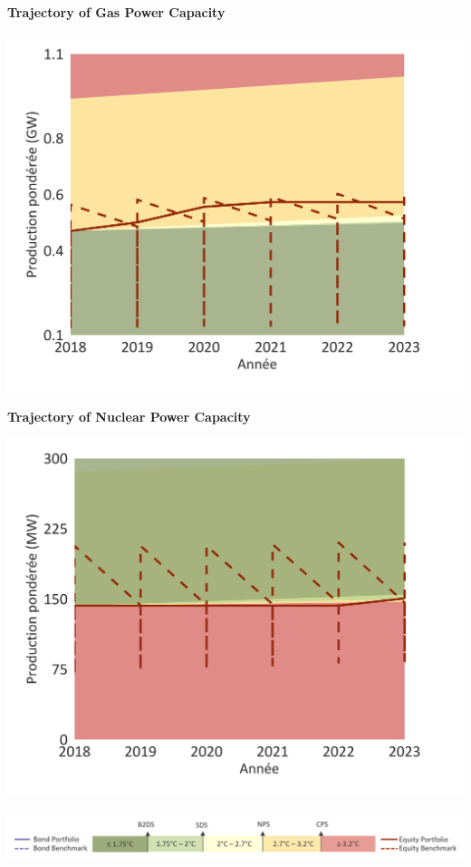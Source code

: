 \documentclass[10pt,table,a4]{article}\usepackage[]{graphicx}\usepackage[]{color}
\begin{document}
	\begin{minipage}[t]{.49\textwidth}
		\textbf{Trajectory of Gas Power Capacity }
		
		\includegraphics[trim = {0 0cm 0 0},width=1\linewidth]{ReportOutputs/Fig19}
		
		\textbf{Trajectory of Nuclear Power Capacity }
		
		\includegraphics[trim = {0 0cm 0 0},width=1\linewidth]{ReportOutputs/Fig20}
		
	\end{minipage}
	
	\vspace{-0.6cm}
	\begin{center}
		\includegraphics[trim = {0 0cm 0 0},width=.9\linewidth]{ReportGraphics/246Legend.png}
	\end{center}
\end{document}
